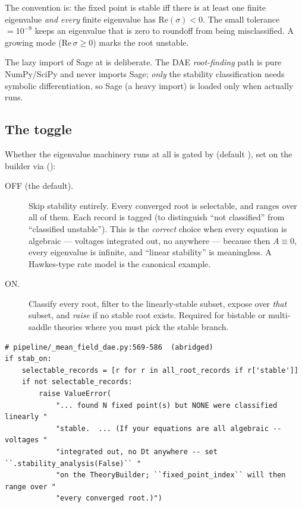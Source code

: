The convention is: the fixed point is stable iff there is at least one finite
eigenvalue \emph{and every} finite eigenvalue has $\mathrm{Re}(\sigma) < 0$. The
small tolerance  $= 10^{-9}$ keeps an eigenvalue that is zero to
roundoff from being misclassified. A growing mode ($\mathrm{Re}\,\sigma \ge 0$)
marks the root unstable.

\begin{note}
The lazy import of Sage at  is deliberate. The DAE
\emph{root-finding} path is pure NumPy/SciPy and never imports Sage; \emph{only}
the stability classification needs symbolic differentiation, so Sage (a heavy
import) is loaded only when  actually runs.
\end{note}

\subsection{The  toggle}

Whether the eigenvalue machinery runs at all is gated by
 (default ), set on the builder via
 ():

\begin{description}
  \item[OFF (the default).] Skip stability entirely. Every converged root is
        selectable, and  ranges over all of them. Each
        record is tagged  (to distinguish ``not classified''
        from ``classified unstable''). This is the \emph{correct} choice when
        every equation is algebraic --- voltages integrated out, no 
        anywhere --- because then $A \equiv 0$, every eigenvalue is infinite, and
        ``linear stability'' is meaningless. A Hawkes-type rate model is the
        canonical example.
  \item[ON.] Classify every root, filter to the linearly-stable subset, expose
         over \emph{that} subset, and \emph{raise} if no
        stable root exists. Required for bistable or multi-saddle theories where
        you must pick the stable branch.
\end{description}

\begin{lstlisting}
# pipeline/_mean_field_dae.py:569-586  (abridged)
if stab_on:
    selectable_records = [r for r in all_root_records if r['stable']]
    if not selectable_records:
        raise ValueError(
            "... found N fixed point(s) but NONE were classified linearly "
            "stable.  ... (If your equations are all algebraic -- voltages "
            "integrated out, no Dt anywhere -- set ``.stability_analysis(False)`` "
            "on the TheoryBuilder; ``fixed_point_index`` will then range over "
            "every converged root.)")
\end{lstlisting}

